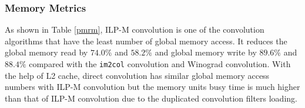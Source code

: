 \documentclass{article}
\begin{document}
\subsubsection{Memory Metrics}

\begin{table}[h!]
\caption{Profile Metrics Related to Memory \label{pmrm}}
\end{table}


As shown in Table \ref{pmrm}, ILP-M convolution is one of the convolution algorithms that have the least number of global memory access. It reduces the global memory read by $74.0\%$ and $58.2\%$ and global memory write by $89.6\%$ and $88.4\%$ compared with the \texttt{im2col} convolution and Winograd convolution. With the help of L2 cache, direct convolution has similar global memory access numbers with ILP-M convolution but the memory units busy time is much higher than that of ILP-M convolution due to the duplicated convolution filters loading. 
\end{document}
